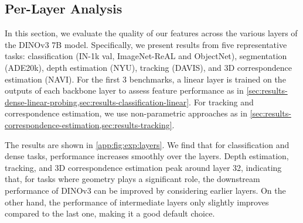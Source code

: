 \subsection{Per-Layer Analysis}

In this section, we evaluate the quality of our features across the various layers of the DINOv3 7B model. 
Specifically, we present results from five representative tasks: classification (IN-1k val, ImageNet-ReAL and ObjectNet), segmentation (ADE20k), depth estimation (NYU), tracking (DAVIS), and 3D correspondence estimation (NAVI).
For the first 3 benchmarks, a linear layer is trained on the outputs of each backbone layer to assess feature performance as in \cref{sec:results-dense-linear-probing,sec:results-classification-linear}.
For tracking and correspondence estimation, we use non-parametric approaches as in \cref{sec:results-correspondence-estimation,sec:results-tracking}.

The results are shown in \cref{app:fig:exp:layers}.
We find that for classification and dense tasks, performance increases smoothly over the layers.
Depth estimation, tracking, and 3D correspondence estimation peak around layer 32, indicating that, for tasks where geometry plays a significant role, the downstream performance of DINOv3 can be improved by considering earlier layers.
On the other hand, the performance of intermediate layers only slightly improves compared to the last one, making it a good default choice.

